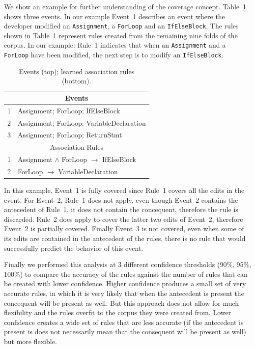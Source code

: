 \documentclass[sigconf]{acmart}
\begin{document}
We show an example for further understanding of the coverage concept.
Table~\ref{rulesandinstances} shows three events. In 
our example Event~1 describes an event
where the developer modified an \texttt{Assignment}, 
a \texttt{ForLoop} and an \texttt{IfElseBlock}.
The rules shown in Table~\ref{rulesandinstances} represent rules created
from the remaining nine folds of the corpus. In our example: Rule~1 
indicates that when an \texttt{Assignment} and a \texttt{ForLoop} 
have been modified,
the next step is to modify an \texttt{IfElseBlock}.

\begin{table}[ht]
  \centering
  \caption{Events (top); learned association rules (bottom). \label{rulesandinstances}}{\small
\begin{tabular}{ll}
\toprule
\multicolumn{2}{c}{Events} \\
\midrule
1 & Assignment; ForLoop; IfElseBlock  \\
2 & Assignment; ForLoop; VariableDeclaration\\  
3 & Assignment; ForLoop;  ReturnStmt \\
\midrule
 \multicolumn{2}{c}{Association Rules} \\                     
\midrule
1 & Assignment $\wedge$ ForLoop $\rightarrow$ IfElseBlock \\  
2 & ForLoop $\rightarrow$ VariableDeclaration \\   
\bottomrule
\end{tabular}
}
\end{table}

In this example, Event~1 is fully covered since Rule~1 covers all
the edits in the event. For Event~2, Rule~1 does not apply, even though
Event~2 contains the antecedent of Rule~1, it does not contain the 
concequent, therefore the rule is discarded. Rule~2 does apply to 
cover the latter two
edits of Event~2,
therefore Event~2 is partially covered. Finally Event~3 is not covered,
even when some of its edits are contained in the antecedent of the rules,
there is no rule that would successfully predict the behavior of this 
event. 

Finally we performed this analysis at 3 different confidence thresholds
(90\%, 95\%, 100\%) to compare the accuracy of the rules against the 
number of rules that can be created with lower confidence. 
Higher confidence produces a small set of very
accurate rules, in which it is very likely that when the antecedent
is present the concequent will be present as well. But this approach
does not allow for much flexibility and the rules overfit to the corpus 
they were created from. Lower 
confidence creates a wide set of rules that are less accurate (if
the antecedent is present is does not necessarily mean that the 
consequent will be present as well) but more flexible. 
\end{document}
